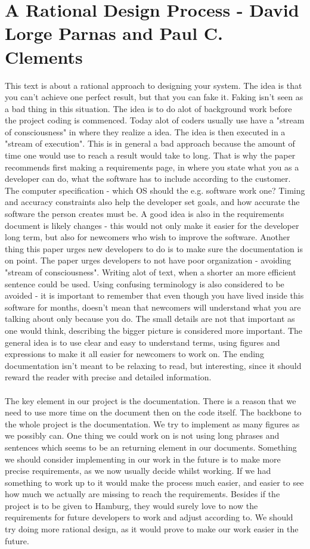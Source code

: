 \documentclass[a4paper]{article}
\begin{document}
\section{A Rational Design Process - David Lorge Parnas and Paul C. Clements}
This text is about a rational approach to designing your system. The idea is that you can't achieve one perfect result, but that you can fake it. Faking isn't seen as a bad thing in this situation. The idea is to do alot of background work before the project coding is commenced. Today alot of coders usually use have a "stream of consciousness" in where they realize a idea. The idea is then executed in a "stream of execution". This is in general a bad approach because the amount of time one would use to reach a result would take to long. That is why the paper recommends first making a requirements page, in where you state what you as a developer can do, what the software has to include according to the customer. The computer specification - which OS should the e.g. software work one? Timing and accuracy constraints also help the developer set goals, and how accurate the software the person creates must be. A good idea is also in the requirements document is likely changes - this would not only make it easier for the developer long term, but also for newcomers who wish to improve the software. Another thing this paper urges new developers to do is to make sure the documentation is on point. The paper urges developers to not have poor organization - avoiding "stream of consciousness". Writing alot of text, when a shorter an more efficient sentence could be used. Using confusing terminology is also considered to be avoided - it is important to remember that even though you have lived inside this software for months, doesn't mean that newcomers will understand what you are talking about only because you do. The small details are not that important as one would think, describing the bigger picture is considered more important.
The general idea is to use clear and easy to understand terms, using figures and expressions to make it all easier for newcomers to work on. The ending documentation isn't meant to be relaxing to read, but interesting, since it should reward the reader with precise and detailed information.
\\
\\
The key element in our project is the documentation. There is a reason that we need to use more time on the document then on the code itself. The backbone to the whole project is the documentation. We try to implement as many figures as we possibly can. One thing we could work on is not using long phrases and sentences which seems to be an returning element in our documents. Something we should consider implementing in our work in the future is to make more precise requirements, as we now usually decide whilst working. If we had something to work up to it would make the process much easier, and easier to see how much we actually are missing to reach the requirements. Besides if the project is to be given to Hamburg, they would surely love to now the requirements for future developers to work and adjust according to. We should try doing more rational design, as it would prove to make our work easier in the future.
\end{document}
